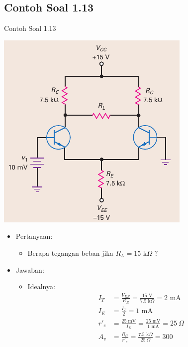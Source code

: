 \documentclass[aspectratio=169]{beamer}
\begin{document}
\subsection{Contoh Soal 1.13}
\begin{frame}{Contoh Soal 1.13}
	\begin{multicols}{2}
		\begin{center}
			\includegraphics[height=0.7\textheight]{gambar/01.fig32}
		\end{center}
		\columnbreak
		\begin{itemize}
			\item Pertanyaan:
			\begin{itemize}
				\item Berapa tegangan beban jika $ R_L = 15 \text{ k}\Omega $ ?
			\end{itemize}
			\item Jawaban:
			\begin{itemize}
				\item Idealnya:
				\begin{align*}
					I_T &= \frac{V_{EE}}{R_E} = \frac{15 \text{ V}}{7.5 \text{ k}\Omega} = 2 \text{ mA} \\
					I_E &= \frac{I_T}{2} = 1 \text{ mA} \\
					r'_e &= \frac{25 \text{ mV}}{I_E} = \frac{25 \text{ mV}}{1 \text{ mA}} = 25~\Omega \\
					A_v &= \frac{R_C}{r'_e} = \frac{7.5 \text{ k}\Omega}{25~\Omega} = 300
				\end{align*}
			\end{itemize}
		\end{itemize}
	\end{multicols}
\end{frame}
\end{document}

